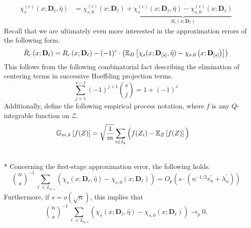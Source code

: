 \begin{equation}
    \begin{aligned}
        \chi_{s}^{(c)}\left(x; \mathbf{D}_{\ell}, \hat{\eta}\right)
        & = \chi_{s,0}^{(c)}\left(x; \mathbf{D}_{\ell}\right) + \underbrace{\chi_{s}^{(c)}\left(x; \mathbf{D}_{\ell}, \hat{\eta}\right) - \chi_{s,0}^{(c)}\left(x; \mathbf{D}_{\ell}\right)}_{R_{c}\left(x; \mathbf{D}_{\ell}\right)}
    \end{aligned}
\end{equation}
Recall that we are ultimately even more interested in the approximation errors of the following form.
\begin{equation}
    \tilde{R}_{c}\left(x; \mathbf{D}_{\ell}\right)
     = R_{c}\left(x; \mathbf{D}_{\ell}\right) - (-1)^{c} \cdot \left(\mathbb{E}_{D}\left[\chi_{s}(x; \mathbf{D}_{[s]}, \widehat{\eta}) - \chi_{s,0}\left(x; \mathbf{D}_{[s]}\right)\right]\right)
\end{equation}
This follows from the following combinatorial fact describing the elimination of centering terms in successive Hoeffding projection terms.
\begin{equation}
    \sum_{j = 1}^{s-1}(-1)^{j+1} \binom{s}{j} = 1 + (-1)^{s}
\end{equation}
Additionally, define the following empirical process notation, where $f$ is any $Q$-integrable function on $\mathcal{Z}$.
\begin{equation}
    \begin{aligned}
        \mathbb{G}_{m,k}\left[f(Z)\right]
        & = \sqrt{\frac{1}{m}} \sum_{i \in I_{k}} \Big(f(Z_i) - \mathbb{E}_{Z}\left[f(Z)\right]\Big)
    \end{aligned}
\end{equation}
    
\newpage

\begin{lem}\label{lem:fs_approx_error}\mbox{}\\*
    Concerning the first-stage approximation error, the following holds.
        \begin{equation}
         \binom{n}{s}^{-1}\sum_{\ell \in L_{n,s}}\left(\chi_{s}\left(x; \mathbf{D}_{\ell}, \hat{\eta}\right) - \chi_{s,0}\left(x; \mathbf{D}_{\ell}\right)\right)
         = O_{p}\left(s \cdot \left(n^{-1/2} r_{n}^{\prime} + \lambda_{n}^{\prime}\right)\right)
    \end{equation}
    Furthermore, if $s = o(\sqrt{n})$, this implies that 
    \begin{equation}
        \binom{n}{s}^{-1}\sum_{\ell \in L_{n,s}}\left(\chi_{s}\left(x; \mathbf{D}_{\ell}, \hat{\eta}\right) - \chi_{s,0}\left(x; \mathbf{D}_{\ell}\right)\right)
        \longrightarrow_{p} 0.
    \end{equation}
\end{lem}

